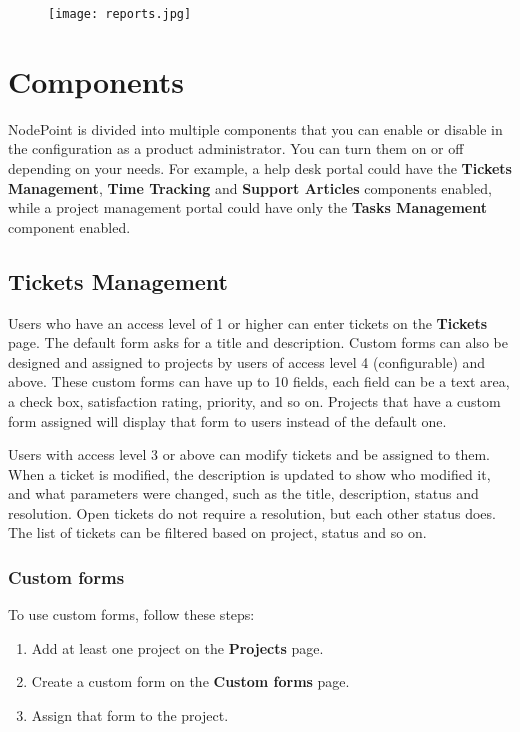 \documentclass[11pt]{article}
\begin{document}
\begin{figure}[h]
\texttt{[image: reports.jpg]}
\end{figure}

\clearpage
\section{Components}
NodePoint is divided into multiple components that you can enable or disable in the configuration as a product administrator. You can turn them on or off depending on your needs. For example, a help desk portal could have the \textbf{Tickets Management}, \textbf{Time Tracking} and \textbf{Support Articles} components enabled, while a project management portal could have only the \textbf{Tasks Management} component enabled.

\subsection{Tickets Management}
Users who have an access level of 1 or higher can enter tickets on the \textbf{Tickets} page. The default form asks for a title and description. Custom forms can also be designed and assigned to projects by users of access level 4 (configurable) and above. These custom forms can have up to 10 fields, each field can be a text area, a check box, satisfaction rating, priority, and so on. Projects that have a custom form assigned will display that form to users instead of the default one.

Users with access level 3 or above can modify tickets and be assigned to them. When a ticket is modified, the description is updated to show who modified it, and what parameters were changed, such as the title, description, status and resolution. Open tickets do not require a resolution, but each other status does. The list of tickets can be filtered based on project, status and so on.

\subsubsection{Custom forms}
To use custom forms, follow these steps:

\begin{enumerate}
\item Add at least one project on the \textbf{Projects} page.
\item Create a custom form on the \textbf{Custom forms} page.
\item Assign that form to the project.
\end{enumerate}
\end{document}
